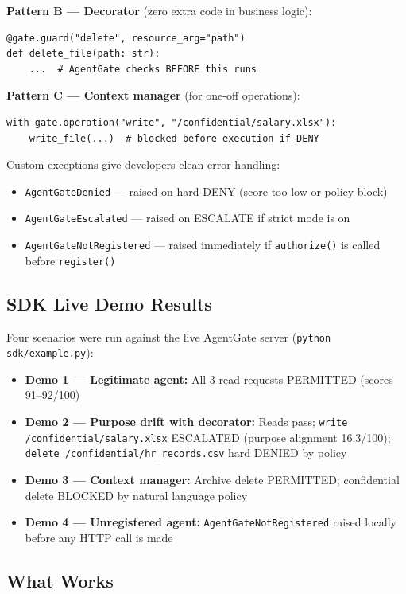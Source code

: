 \documentclass[12pt, a4paper]{article}
\begin{document}
\textbf{Pattern B — Decorator} (zero extra code in business logic):
\begin{verbatim}
@gate.guard("delete", resource_arg="path")
def delete_file(path: str):
    ...  # AgentGate checks BEFORE this runs
\end{verbatim}

\textbf{Pattern C — Context manager} (for one-off operations):
\begin{verbatim}
with gate.operation("write", "/confidential/salary.xlsx"):
    write_file(...)  # blocked before execution if DENY
\end{verbatim}

Custom exceptions give developers clean error handling:
\begin{itemize}[noitemsep]
  \item \texttt{AgentGateDenied} — raised on hard DENY (score too low or policy block)
  \item \texttt{AgentGateEscalated} — raised on ESCALATE if strict mode is on
  \item \texttt{AgentGateNotRegistered} — raised immediately if \texttt{authorize()} is called before \texttt{register()}
\end{itemize}

\subsection{SDK Live Demo Results}

Four scenarios were run against the live AgentGate server (\texttt{python sdk/example.py}):

\begin{itemize}[noitemsep]
  \item \textbf{Demo 1 — Legitimate agent:} All 3 read requests PERMITTED (scores 91--92/100)
  \item \textbf{Demo 2 — Purpose drift with decorator:} Reads pass; \texttt{write /confidential/salary.xlsx} ESCALATED (purpose alignment 16.3/100); \texttt{delete /confidential/hr\_records.csv} hard DENIED by policy
  \item \textbf{Demo 3 — Context manager:} Archive delete PERMITTED; confidential delete BLOCKED by natural language policy
  \item \textbf{Demo 4 — Unregistered agent:} \texttt{AgentGateNotRegistered} raised locally before any HTTP call is made
\end{itemize}

\subsection{What Works}
\end{document}
